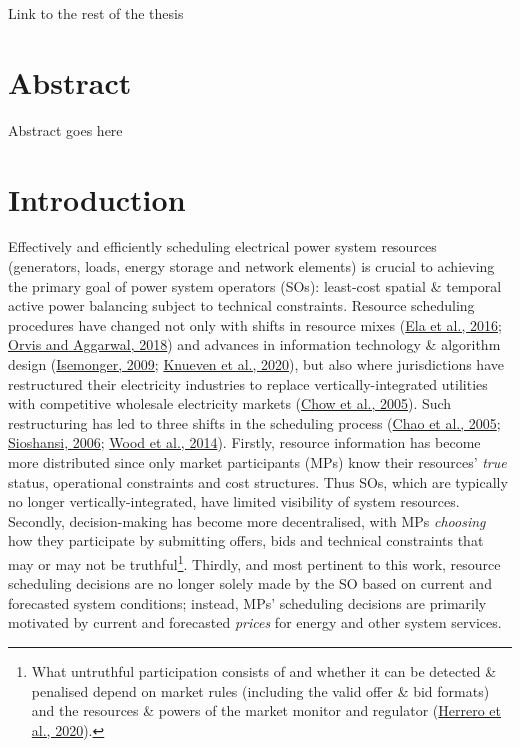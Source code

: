 \documentclass[12pt,a4paper,]{report}
\begin{document}
Link to the rest of the thesis

\hypertarget{abstract-3}{%
\section{Abstract}\label{abstract-3}}

Abstract goes here

\hypertarget{sec:info-intro}{%
\section{Introduction}\label{sec:info-intro}}

Effectively and efficiently scheduling electrical power system resources
(generators, loads, energy storage and network elements) is crucial to
achieving the primary goal of power system operators (SOs): least-cost
spatial \& temporal active power balancing subject to technical
constraints. Resource scheduling procedures have changed not only with
shifts in resource mixes
(\protect\hyperlink{ref-elaWholesaleElectricityMarket2016}{Ela et al.,
2016};
\protect\hyperlink{ref-orvisRefiningCompetitiveElectricity2018}{Orvis
and Aggarwal, 2018}) and advances in information technology \& algorithm
design
(\protect\hyperlink{ref-isemongerEvolvingDesignRTO2009}{Isemonger,
2009};
\protect\hyperlink{ref-knuevenMixedintegerProgrammingFormulations2020}{Knueven
et al., 2020}), but also where jurisdictions have restructured their
electricity industries to replace vertically-integrated utilities with
competitive wholesale electricity markets
(\protect\hyperlink{ref-chowElectricityMarketDesign2005}{Chow et al.,
2005}). Such restructuring has led to three shifts in the scheduling
process (\protect\hyperlink{ref-chaoInterfaceEngineeringMarket2005}{Chao
et al., 2005};
\protect\hyperlink{ref-sioshansiElectricityMarketReform2006}{Sioshansi,
2006}; \protect\hyperlink{ref-woodPowerGenerationOperation2014}{Wood et
al., 2014}). Firstly, resource information has become more distributed
since only market participants (MPs) know their resources' \emph{true}
status, operational constraints and cost structures. Thus SOs, which are
typically no longer vertically-integrated, have limited visibility of
system resources. Secondly, decision-making has become more
decentralised, with MPs \emph{choosing} how they participate by
submitting offers, bids and technical constraints that may or may not be
truthful\footnote{What untruthful participation consists of and whether
  it can be detected \& penalised depend on market rules (including the
  valid offer \& bid formats) and the resources \& powers of the market
  monitor and regulator
  (\protect\hyperlink{ref-herreroEvolvingBiddingFormats2020}{Herrero et
  al., 2020}).}. Thirdly, and most pertinent to this work, resource
scheduling decisions are no longer solely made by the SO based on
current and forecasted system conditions; instead, MPs' scheduling
decisions are primarily motivated by current and forecasted
\emph{prices} for energy and other system services.
\end{document}
